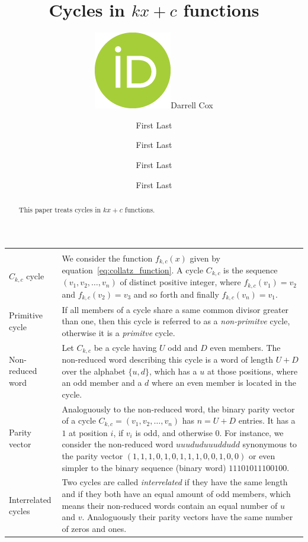 \documentclass[12pt]{amsart}
\title[Cycles in kx+c functions]{Cycles in $kx+c$ functions}
\author[F.\ Last1]{\href{https://orcid.org/0000-0000-0000-0000}{\includegraphics[scale=0.06]{orcid.png}}\hspace{1mm}Darrell Cox}
\author[F.\ Last2]{First Last}
\author[F.\ Last3]{First Last}
\author[F.\ Last4]{First Last}
\author[F.\ Last5]{First Last}
\theoremstyle{definition}
\begin{document}
	
\begingroup
\let\MakeUppercase\relax
\maketitle
\endgroup

\begin{abstract}
This paper treats cycles in $kx+c$ functions. 
\end{abstract}

\newpage
{\renewcommand{\arraystretch}{1.8}
\begin{table}[H]
	\centering
	\begin{tabular}{|P{1.4cm} p{13.4cm}|}
		\hline
		\\
		$C_{k,c}$ cycle & We consider the function $f_{k,c}(x)$ given by equation~\ref{eq:collatz_function}. A cycle $C_{k,c}$ is the sequence $(v_1, v_2,\ldots, v_n)$ of distinct positive integer, where $f_{k,c}(v_1)=v_2$ and $f_{k,c}(v_2)=v_3$ and so forth and finally $f_{k,c}(v_n)=v_1$.
		\\
		Primitive cycle & If all members of a cycle share a same common divisor greater than one, then this cycle is referred to as a \textit{non-primitve} cycle, otherwise it is a \textit{primitve} cycle.
		\\
		Non-reduced word & Let $C_{k,c}$ be a cycle having $U$ odd and $D$ even members. The non-reduced word describing this cycle is a word of length $U+D$ over the alphabet $\{u,d\}$, which has a $u$ at those positions, where an odd member and a $d$ where an even member is located in the cycle.
		\\
		Parity vector & Analoguously to the non-reduced word, the binary parity vector of a cycle $C_{k,c}=(v_1,v_2,\ldots,v_n)$ has $n=U+D$ entries. It has a $1$ at position $i$, if $v_i$ is odd, and otherwise $0$. For instance, we consider the non-reduced word $uuududuuuddudd$ synonymous to the parity vector $(1,1,1,0,1,0,1,1,1,0,0,1,0,0)$ or even simpler to the binary sequence (binary word) $11101011100100$.
		\\
		Interrelated cycles & Two cycles are called \textit{interrelated} if they have the same length and if they both have an equal amount of odd members, which means their non-reduced words contain an equal number of $u$ and $v$. Analoguously their parity vectors have the same number of zeros and ones. 
		\\ \hline
	\end{tabular}
\end{table}}
\end{document}
